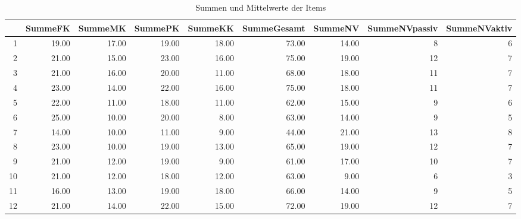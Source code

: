 \begin{table}[ht]
\centering
\caption{Summen und Mittelwerte der Items}
\begin{tabular}{rrrrrrrrr}
  \hline
 & SummeFK & SummeMK & SummePK & SummeKK & SummeGesamt & SummeNV & SummeNVpassiv & SummeNVaktiv \\
  \hline
1 & 19.00 & 17.00 & 19.00 & 18.00 & 73.00 & 14.00 &   8 &   6 \\
  2 & 21.00 & 15.00 & 23.00 & 16.00 & 75.00 & 19.00 &  12 &   7 \\
  3 & 21.00 & 16.00 & 20.00 & 11.00 & 68.00 & 18.00 &  11 &   7 \\
  4 & 23.00 & 14.00 & 22.00 & 16.00 & 75.00 & 18.00 &  11 &   7 \\
  5 & 22.00 & 11.00 & 18.00 & 11.00 & 62.00 & 15.00 &   9 &   6 \\
  6 & 25.00 & 10.00 & 20.00 & 8.00 & 63.00 & 14.00 &   9 &   5 \\
  7 & 14.00 & 10.00 & 11.00 & 9.00 & 44.00 & 21.00 &  13 &   8 \\
  8 & 23.00 & 10.00 & 19.00 & 13.00 & 65.00 & 19.00 &  12 &   7 \\
  9 & 21.00 & 12.00 & 19.00 & 9.00 & 61.00 & 17.00 &  10 &   7 \\
  10 & 21.00 & 12.00 & 18.00 & 12.00 & 63.00 & 9.00 &   6 &   3 \\
  11 & 16.00 & 13.00 & 19.00 & 18.00 & 66.00 & 14.00 &   9 &   5 \\
  12 & 21.00 & 14.00 & 22.00 & 15.00 & 72.00 & 19.00 &  12 &   7 \\
   \hline
\end{tabular}
\end{table}
